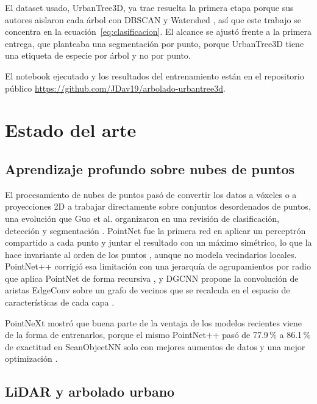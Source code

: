 \documentclass[preprint,12pt]{elsarticle}
\begin{document}
El dataset usado, UrbanTree3D, ya trae resuelta la primera etapa porque sus autores aislaron cada árbol con DBSCAN y Watershed \cite{hamdani2026hybrid,hamdani2026urbantree3d}, así que este trabajo se concentra en la ecuación~\eqref{eq:clasificacion}. El alcance se ajustó frente a la primera entrega, que planteaba una segmentación por punto, porque UrbanTree3D tiene una etiqueta de especie por árbol y no por punto.

El notebook ejecutado y los resultados del entrenamiento están en el repositorio público \url{https://github.com/JDav19/arbolado-urbantree3d}.

\section{Estado del arte}
\label{sec:estado-arte}

\subsection{Aprendizaje profundo sobre nubes de puntos}

El procesamiento de nubes de puntos pasó de convertir los datos a vóxeles o a proyecciones 2D a trabajar directamente sobre conjuntos desordenados de puntos, una evolución que Guo et al. organizaron en una revisión de clasificación, detección y segmentación \cite{guo2021survey}. PointNet fue la primera red en aplicar un perceptrón compartido a cada punto y juntar el resultado con un máximo simétrico, lo que la hace invariante al orden de los puntos \cite{qi2017pointnet}, aunque no modela vecindarios locales. PointNet++ corrigió esa limitación con una jerarquía de agrupamientos por radio que aplica PointNet de forma recursiva \cite{qi2017pointnetpp}, y DGCNN propone la convolución de aristas EdgeConv sobre un grafo de vecinos que se recalcula en el espacio de características de cada capa \cite{wang2019dgcnn}.

PointNeXt mostró que buena parte de la ventaja de los modelos recientes viene de la forma de entrenarlos, porque el mismo PointNet++ pasó de 77.9\,\% a 86.1\,\% de exactitud en ScanObjectNN solo con mejores aumentos de datos y una mejor optimización \cite{qian2022pointnext}.

\subsection{LiDAR y arbolado urbano}
\end{document}
